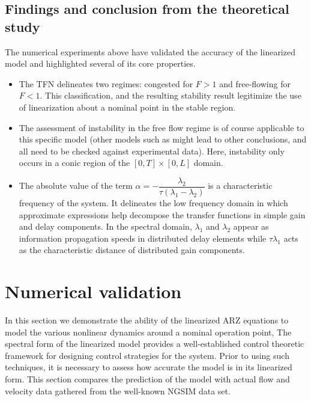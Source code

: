 \documentclass[preprint]{elsarticle}
\begin{document}
\subsection{Findings and conclusion from the theoretical study}
The numerical experiments above have validated the accuracy of the linearized model and highlighted several of its core properties.
\begin{itemize}
\item The TFN delineates two regimes: congested for $F > 1$ and free-flowing for $F < 1$. This classification, and the resulting stability result legitimize the use of linearization about a nominal point in the stable region.
\item  The assessment of instability in the free flow regime is of course applicable to this specific model (other models such as \cite{Jamitons-multi-valued-fund} might lead to other conclusions, and all need to be checked against experimental data). Here, instability only occurs in a conic region of the  $\left[0,T\right] \times \left[0,L\right]$ domain.
\item The absolute value of the term $\alpha = -\dfrac{\lambda_2}{\tau(\lambda_1 - \lambda_2)}$ is a characteristic frequency of the system. It delineates the low frequency domain in which approximate expressions help decompose the transfer functions in simple gain and delay components. In the spectral domain, $\lambda_{1}$ and $\lambda_{2}$ appear as information propagation speeds in distributed delay elements while  $\tau\lambda_{1}$ acts as the characteristic distance of distributed gain components.
\end{itemize}


\section{Numerical validation}

In this section we demonstrate the ability of the linearized ARZ equations to model the various nonlinear dynamics around a nominal operation point, The spectral form of the linearized
model provides a well-established control theoretic framework for designing control strategies for the system. Prior to using such techniques, it is necessary to assess how accurate the
model is in its linearized form. This section compares the prediction of the model with actual flow
and velocity data gathered from the well-known NGSIM data set.
\end{document}

